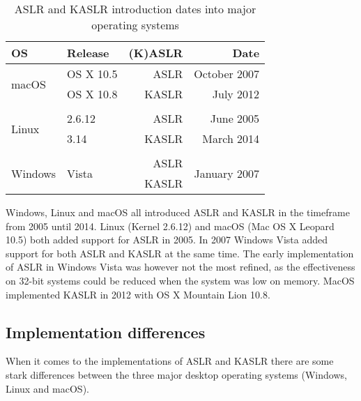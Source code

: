\begin{table}[!ht]
    \small
    \centering
    \begin{tabular}{llrr}
    \hline
        \textbf{OS} & \textbf{Release} & \textbf{(K)ASLR} & \textbf{Date} \\ \hline
        \multirow{2}{*}{macOS}   & OS X 10.5              &  ASLR & October 2007 \\ 
                                 & OS X 10.8              & KASLR & July 2012    \\ \\
        \multirow{2}{*}{Linux}   & 2.6.12                 &  ASLR & June 2005    \\ 
                                 & 3.14                   & KASLR & March 2014   \\ \\
        \multirow{2}{*}{Windows} & \multirow{2}{*}{Vista} &  ASLR & \multirow{2}{*}{January 2007} \\
                                 &                        & KASLR & \\ \hline
    \end{tabular}
    \caption{ASLR and KASLR introduction dates into major operating systems}
\end{table}

Windows, Linux and macOS all introduced ASLR and KASLR in the timeframe from 2005 until 2014.
Linux (Kernel 2.6.12) and macOS (Mac OS X Leopard 10.5) both added support for ASLR in 2005.
In 2007 Windows Vista added support for both ASLR and KASLR at the same time. The early implementation of ASLR in Windows Vista was however not the most refined, as the effectiveness on 32-bit systems could be reduced when the system was low on memory.
MacOS implemented KASLR in 2012 with OS X Mountain Lion 10.8.

\subsection{Implementation differences}

When it comes to the implementations of ASLR and KASLR there are some stark differences between the three major desktop operating systems (Windows, Linux and macOS).

